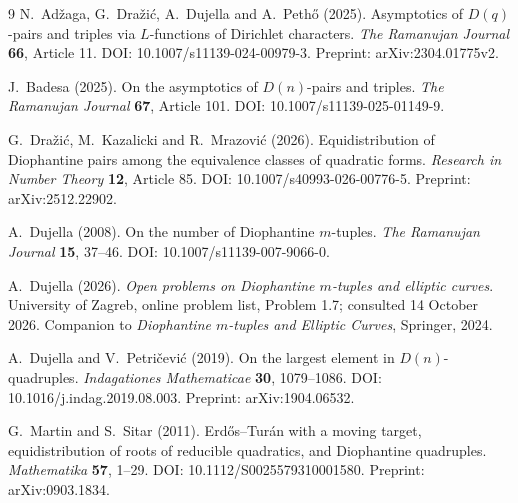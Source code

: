 \documentclass[11pt,a4paper]{article}
\numberwithin{equation}{section}
\theoremstyle{remark}
\begin{document}
\begin{thebibliography}{9}
N.~Ad\v zaga, G.~Dra\v zi\'c, A.~Dujella and A.~Peth\H o (2025).
Asymptotics of $D(q)$-pairs and triples via $L$-functions of Dirichlet characters.
\emph{The Ramanujan Journal} \textbf{66}, Article 11.
DOI: 10.1007/s11139-024-00979-3. Preprint: arXiv:2304.01775v2.

J.~Badesa (2025). On the asymptotics of $D(n)$-pairs and triples.
\emph{The Ramanujan Journal} \textbf{67}, Article 101.
DOI: 10.1007/s11139-025-01149-9.

G.~Dra\v zi\'c, M.~Kazalicki and R.~Mrazovi\'c (2026).
Equidistribution of Diophantine pairs among the equivalence classes of quadratic forms.
\emph{Research in Number Theory} \textbf{12}, Article 85.
DOI: 10.1007/s40993-026-00776-5. Preprint: arXiv:2512.22902.

A.~Dujella (2008). On the number of Diophantine $m$-tuples.
\emph{The Ramanujan Journal} \textbf{15}, 37--46.
DOI: 10.1007/s11139-007-9066-0.

A.~Dujella (2026). \emph{Open problems on Diophantine $m$-tuples and elliptic curves}.
University of Zagreb, online problem list, Problem 1.7; consulted 14 October 2026.
Companion to \emph{Diophantine $m$-tuples and Elliptic Curves}, Springer, 2024.

A.~Dujella and V.~Petri\v cevi\'c (2019). On the largest element in $D(n)$-quadruples.
\emph{Indagationes Mathematicae} \textbf{30}, 1079--1086.
DOI: 10.1016/j.indag.2019.08.003. Preprint: arXiv:1904.06532.

G.~Martin and S.~Sitar (2011). Erd\H os--Tur\'an with a moving target, equidistribution of roots of reducible quadratics, and Diophantine quadruples.
\emph{Mathematika} \textbf{57}, 1--29.
DOI: 10.1112/S0025579310001580. Preprint: arXiv:0903.1834.
\end{thebibliography}
\end{document}
